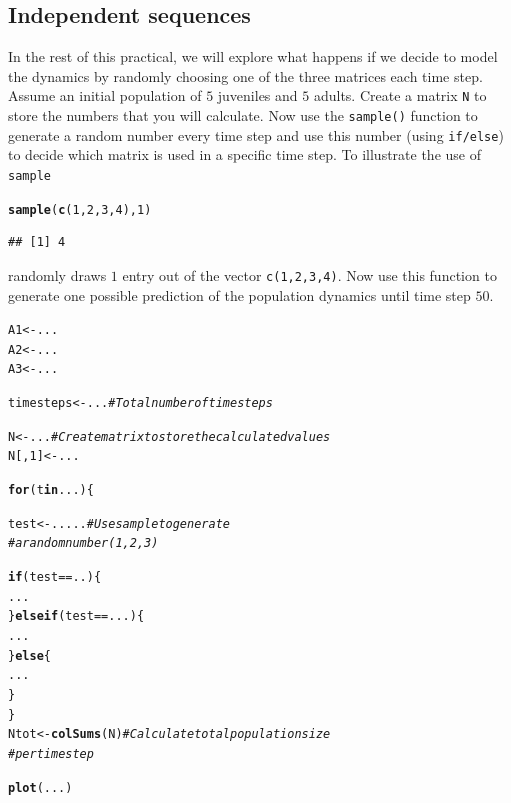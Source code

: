 \documentclass{article}\usepackage[]{graphicx}\usepackage[]{color}
\makeatletter
\newcommand{\hlnum}[1]{\textcolor[rgb]{0.686,0.059,0.569}{#1}}%
\newcommand{\hlcom}[1]{\textcolor[rgb]{0.678,0.584,0.686}{\textit{#1}}}%
\newcommand{\hlopt}[1]{\textcolor[rgb]{0,0,0}{#1}}%
\newcommand{\hlstd}[1]{\textcolor[rgb]{0.345,0.345,0.345}{#1}}%
\newcommand{\hlkwa}[1]{\textcolor[rgb]{0.161,0.373,0.58}{\textbf{#1}}}%
\newcommand{\hlkwb}[1]{\textcolor[rgb]{0.69,0.353,0.396}{#1}}%
\newcommand{\hlkwd}[1]{\textcolor[rgb]{0.737,0.353,0.396}{\textbf{#1}}}%
\newenvironment{kframe}{%
 \def\at@end@of@kframe{}%
 \ifinner\ifhmode%
  \def\at@end@of@kframe{\end{minipage}}%
  \begin{minipage}{\columnwidth}%
 \fi\fi%
 \def\FrameCommand##1{\hskip\@totalleftmargin \hskip-\fboxsep
 \colorbox{shadecolor}{##1}\hskip-\fboxsep
     \hskip-\linewidth \hskip-\@totalleftmargin \hskip\columnwidth}%
 \MakeFramed {\advance\hsize-\width
   \@totalleftmargin\z@ \linewidth\hsize
   \@setminipage}}%
 {\par\unskip\endMakeFramed%
 \at@end@of@kframe}
\newenvironment{knitrout}{}{} %
\makeatother
\begin{document}
\subsection{Independent sequences}
In the rest of this practical, we will explore what happens if we decide to model the dynamics by randomly choosing one of the three matrices each time step. Assume an initial population of $5$ juveniles and $5$ adults. Create a matrix \texttt{N} to store the numbers that you will calculate. Now use the \texttt{sample()} function to generate a random number every time step and use this number (using \texttt{if/else}) to decide which matrix is used in a specific time step. To illustrate the use of \texttt{sample}
\begin{knitrout}
\color{fgcolor}\begin{kframe}
\begin{alltt}
\hlkwd{sample}\hlstd{(}\hlkwd{c}\hlstd{(}\hlnum{1}\hlstd{,}\hlnum{2}\hlstd{,}\hlnum{3}\hlstd{,}\hlnum{4}\hlstd{),}\hlnum{1}\hlstd{)}
\end{alltt}
\begin{verbatim}
## [1] 4
\end{verbatim}
\end{kframe}
\end{knitrout}
randomly draws $1$ entry out of the vector \texttt{c(1,2,3,4)}. Now use this function to generate one possible prediction of the population dynamics until time step $50$.

\begin{knitrout}
\color{fgcolor}\begin{kframe}
\begin{alltt}
\hlstd{A1}\hlkwb{<-}\hlstd{...}
\hlstd{A2}\hlkwb{<-}\hlstd{...}
\hlstd{A3}\hlkwb{<-}\hlstd{...}

\hlstd{timesteps}\hlkwb{<-}\hlstd{...} \hlcom{# Total number of timesteps}

\hlstd{N}\hlkwb{<-}\hlstd{...} \hlcom{# Create matrix to store the calculated values}
\hlstd{N[,}\hlnum{1}\hlstd{]}\hlkwb{<-}\hlstd{...}

\hlkwa{for}\hlstd{(t} \hlkwa{in} \hlstd{...)\{}

  \hlstd{test}\hlkwb{<-}\hlstd{.....} \hlcom{# Use sample to generate }
              \hlcom{# a random number (1,2,3)}

  \hlkwa{if}\hlstd{(test}\hlopt{==}\hlstd{..)\{}
    \hlstd{...}
  \hlstd{\}}\hlkwa{else if}\hlstd{(test}\hlopt{==}\hlstd{...)\{}
    \hlstd{...}
  \hlstd{\}}\hlkwa{else}\hlstd{\{}
    \hlstd{...}
  \hlstd{\}}
\hlstd{\}}
\hlstd{Ntot}\hlkwb{<-}\hlkwd{colSums}\hlstd{(N)}  \hlcom{# Calculate total population size}
                  \hlcom{# per timestep}

\hlkwd{plot}\hlstd{(...)}
\end{alltt}
\end{kframe}
\end{knitrout}
\end{document}
